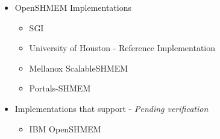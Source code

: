 \begin{itemize}
\begin{itemize}
  \end{itemize}
\item OpenSHMEM Implementations 
 \begin{itemize}
  \item SGI \openshmem
  \item University of Houston - \openshmem Reference Implementation
  \item Mellanox ScalableSHMEM
  \item Portals-SHMEM
  \end{itemize} 
  \item Implementations that support \openshmem - \textit{Pending verification}
 \begin{itemize}
  \item IBM OpenSHMEM
  \end{itemize}
\end{itemize}



